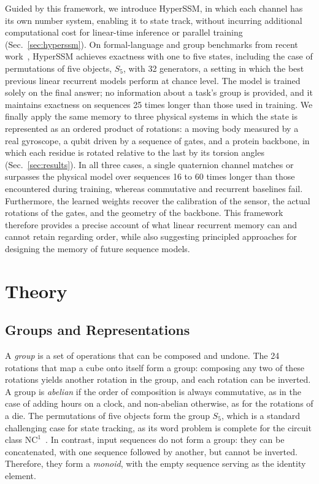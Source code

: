 \documentclass[aps,prx,reprint,superscriptaddress,longbibliography,nofootinbib,floatfix]{revtex4-2}
\theoremstyle{plain}
\theoremstyle{definition}
\begin{document}
Guided by this framework, we introduce HyperSSM, in which each channel has
its own number system, enabling it to state track, without incurring additional computational cost for linear-time inference or parallel training (Sec.~\ref{sec:hyperssm}). On formal-language and group benchmarks from recent work~\cite{walker_slice,pdssm}, HyperSSM achieves exactness with one to five states, including the case of permutations of five objects, $S_5$, with 32 generators, a setting in which the best previous linear recurrent models perform at chance level. The model is trained solely on the final answer; no information about a task's group is provided, and it maintains exactness on sequences 25 times longer than those used in training. We finally apply the same memory to three physical systems in which the state is represented as an ordered product of rotations: a moving body measured by a real gyroscope, a qubit driven by a sequence of gates, and a protein backbone, in which each residue is rotated relative to the last by its torsion angles (Sec.~\ref{sec:results}). In all three cases, a single quaternion channel matches or surpasses the physical model over sequences 16 to 60 times longer than those encountered during training, whereas commutative and recurrent baselines fail. Furthermore, the learned weights recover the calibration of the sensor, the actual rotations of the gates, and the geometry of the backbone. This framework therefore provides a precise account of what linear recurrent memory can and cannot retain regarding order, while also suggesting principled approaches for designing the memory of future sequence models.


\section{Theory}

\subsection{Groups and Representations}

A \textit{group} is a set of operations that can be composed and undone. The
24 rotations that map a cube onto itself form a group: composing any two of these rotations yields another rotation in the group,
and each rotation can be inverted. A group is \textit{abelian} if the
order of composition is always commutative, as in the case of adding hours on a clock, and
non-abelian otherwise, as for the rotations of a die. The permutations of
five objects form the group $S_5$, which is a standard challenging case for state
tracking, as its word problem is complete for the circuit class
$\mathrm{NC}^1$~\cite{merrill_illusion,barrington}. In contrast, input sequences
do not form a group: they can be concatenated, with one sequence followed by another,
but cannot be inverted. Therefore, they form a \textit{monoid}, with the empty
sequence serving as the identity element.
\end{document}
